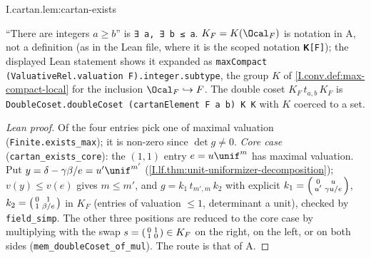 \begin{lemma}
\end{lemma}
\begin{tfformal}{I.cartan.lem:cartan-exists}
\begin{tffidelity}
``There are integers $a\ge b$'' is \texttt{∃ a, ∃ b ≤ a}. $K_F=K(\Ocal_F)$ is notation in A, not a definition (as in the Lean file, where it is the scoped notation \texttt{𝐊[F]}); the displayed Lean statement shows it expanded as \texttt{maxCompact (ValuativeRel.valuation F).integer.subtype}, the group $K$ of \cref{I.conv.def:max-compact-local} for the inclusion $\Ocal_F\hookrightarrow F$. The double coset $K_F\,t_{a,b}\,K_F$ is \texttt{DoubleCoset.doubleCoset (cartanElement F a b) K K} with $K$ coerced to a set.
\end{tffidelity}
\end{tfformal}
\begin{proof}[Lean proof]
Of the four entries pick one of maximal valuation (\texttt{Finite.exists\_max}); it is non-zero since $\det g\neq0$. \emph{Core case} (\texttt{cartan\_exists\_core}): the $(1,1)$ entry $e=u\unif^m$ has maximal valuation. Put $y=\delta-\gamma\beta/e=u'\unif^{m'}$ (\cref{I.lf.thm:unit-uniformizer-decomposition}); $v(y)\le v(e)$ gives $m\le m'$, and $g=k_1\,t_{m',m}\,k_2$ with explicit $k_1=\begin{psmallmatrix}0&u\\u'&\gamma u/e\end{psmallmatrix}$, $k_2=\begin{psmallmatrix}0&1\\1&\beta/e\end{psmallmatrix}$ in $K_F$ (entries of valuation $\le1$, determinant a unit), checked by \texttt{field\_simp}. The other three positions are reduced to the core case by multiplying with the swap $s=\begin{psmallmatrix}0&1\\1&0\end{psmallmatrix}\in K_F$ on the right, on the left, or on both sides (\texttt{mem\_doubleCoset\_of\_mul}). The route is that of A.
\end{proof}

